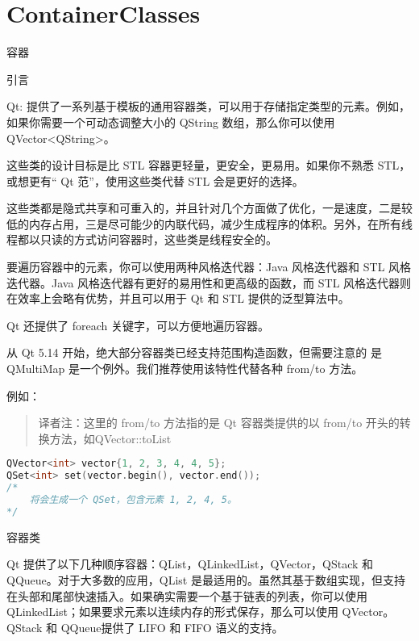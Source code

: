 \chapter{ContainerClasses}

容器

\splitLine

引言

Qt: 提供了一系列基于模板的通用容器类，可以用于存储指定类型的元素。例如，如果你需要一个可动态调整大小的 QString 数组，那么你可以使用 QVector<QString>。

这些类的设计目标是比 STL 容器更轻量，更安全，更易用。如果你不熟悉 STL，或想更有“ Qt 范”，使用这些类代替 STL 会是更好的选择。

这些类都是隐式共享和可重入的，并且针对几个方面做了优化，一是速度，二是较低的内存占用，三是尽可能少的内联代码，减少生成程序的体积。另外，在所有线程都以只读的方式访问容器时，这些类是线程安全的。

要遍历容器中的元素，你可以使用两种风格迭代器：Java 风格迭代器和 STL 风格迭代器。Java 风格迭代器有更好的易用性和更高级的函数，而 STL 风格迭代器则在效率上会略有优势，并且可以用于 Qt 和 STL 提供的泛型算法中。

Qt 还提供了 foreach 关键字，可以方便地遍历容器。

\begin{notice}
从 Qt 5.14 开始，绝大部分容器类已经支持范围构造函数，但需要注意的
是 QMultiMap 是一个例外。我们推荐使用该特性代替各种 from/to 方法。
\end{notice}

例如：

\begin{quote}
译者注：这里的 from/to 方法指的是 Qt 容器类提供的以 from/to 开头的转换方法，如QVector::toList
\end{quote}

\begin{lstlisting}[language=C++]
QVector<int> vector{1, 2, 3, 4, 4, 5};
QSet<int> set(vector.begin(), vector.end());
/*
    将会生成一个 QSet，包含元素 1, 2, 4, 5。
*/
\end{lstlisting}

容器类

\splitLine

Qt 提供了以下几种顺序容器：QList，QLinkedList，QVector，QStack 和 QQueue。对于大多数的应用，QList 是最适用的。虽然其基于数组实现，但支持在头部和尾部快速插入。如果确实需要一个基于链表的列表，你可以使用 QLinkedList；如果要求元素以连续内存的形式保存，那么可以使用 QVector。QStack 和 QQueue提供了 LIFO 和 FIFO 语义的支持。


